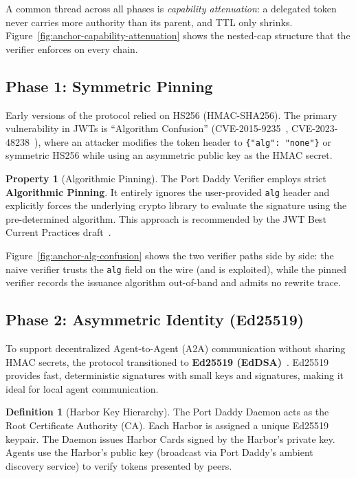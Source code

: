 \documentclass[11pt,a4paper]{article}
\theoremstyle{definition}
\newtheorem{definition}{Definition}[section]
\newtheorem{property}{Property}[section]
\begin{document}
A common thread across all phases is \emph{capability attenuation}: a delegated token never carries more authority than its parent, and TTL only shrinks. Figure~\ref{fig:anchor-capability-attenuation} shows the nested-cap structure that the verifier enforces on every chain.



\subsection{Phase 1: Symmetric Pinning}

Early versions of the protocol relied on HS256 (HMAC-SHA256). The primary vulnerability in JWTs is ``Algorithm Confusion'' (CVE-2015-9235~\cite{cve20159235}, CVE-2023-48238~\cite{cve202348238}), where an attacker modifies the token header to \texttt{\{"alg": "none"\}} or symmetric HS256 while using an asymmetric public key as the HMAC secret.

\begin{property}[Algorithmic Pinning]\label{prop:alg-pinning}
The Port Daddy Verifier employs strict \textbf{Algorithmic Pinning}. It entirely ignores the user-provided \texttt{alg} header and explicitly forces the underlying crypto library to evaluate the signature using the pre-determined algorithm. This approach is recommended by the JWT Best Current Practices draft~\cite{ietf2024jwtbcp}.
\end{property}

Figure~\ref{fig:anchor-alg-confusion} shows the two verifier paths side by side: the naive verifier trusts the \texttt{alg} field on the wire (and is exploited), while the pinned verifier records the issuance algorithm out-of-band and admits no rewrite trace.



\subsection{Phase 2: Asymmetric Identity (Ed25519)}

To support decentralized Agent-to-Agent (A2A) communication without sharing HMAC secrets, the protocol transitioned to \textbf{Ed25519 (EdDSA)}~\cite{bernstein2012high,josefsson2017edwards}. Ed25519 provides fast, deterministic signatures with small keys and signatures, making it ideal for local agent communication.

\begin{definition}[Harbor Key Hierarchy]
The Port Daddy Daemon acts as the Root Certificate Authority (CA). Each Harbor is assigned a unique Ed25519 keypair. The Daemon issues Harbor Cards signed by the Harbor's private key. Agents use the Harbor's public key (broadcast via Port Daddy's ambient discovery service) to verify tokens presented by peers.
\end{definition}
\end{document}
